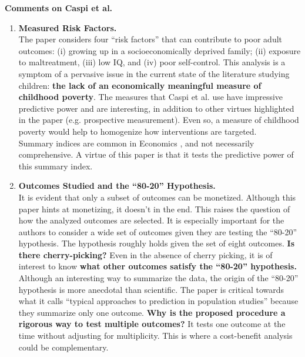 



\doublespacing

\noindent \textbf{Comments on Caspi et al.}\\

\noindent

\begin{enumerate}

\item \textbf{Measured Risk Factors.}\\
\noindent The paper considers four ``risk factors'' that can contribute to poor adult outcomes: (i) growing up in a socioeconomically deprived family; (ii) exposure to maltreatment, (iii) low IQ, and (iv) poor self-control. This analysis is a symptom of a pervasive issue in the current state of the literature studying children: \textbf{the lack of an economically meaningful measure of childhood poverty}. The measures that Caspi et al. use have impressive predictive power and are interesting, in addition to other virtues highlighted in the paper (e.g. prospective measurement). Even so, a measure of childhood poverty would help to homogenize how interventions are targeted. \\

\noindent Summary indices are common in Economics \citep[e.g.][]{Kline_Walters_2016_QJE}, and not necessarily comprehensive. A virtue of this paper is that it tests the predictive power of this summary index.\\

\item \textbf{Outcomes Studied and the ``80-20'' Hypothesis.}\\
\noindent It is evident that only a subset of outcomes can be monetized. Although this paper hints at monetizing, it doesn't in the end. This raises the question of how the analyzed outcomes are selected. It is especially important for the authors to consider a wide set of outcomes given they are testing the ``80-20'' hypothesis. The hypothesis roughly holds given the set of eight outcomes. \textbf{Is there cherry-picking?} Even in the absence of cherry picking, it is of interest to know \textbf{what other outcomes satisfy the ``80-20'' hypothesis.} \\

\noindent Although an interesting way to summarize the data, the origin of the ``80-20'' hypothesis is more anecdotal than scientific. The paper is critical towards what it calls ``typical approaches to prediction in population studies'' because they summarize only one outcome. \textbf{Why is the proposed procedure a rigorous way to test multiple outcomes?} It tests one outcome at the time without adjusting for multiplicity. This is where a cost-benefit analysis could be complementary. \\


\end{enumerate}
